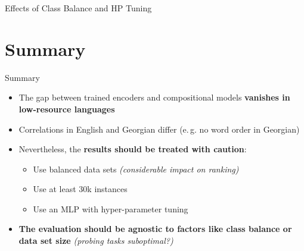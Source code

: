 \documentclass[accentcolor=tud1a,colorbacktitle,inverttitle,landscape,german,presentation,t]{tudbeamer}
\begin{document}
\begin{frame}{Effects of Class Balance and HP Tuning}{}
	\vspace*{-8mm}
	
\end{frame}

\section{Summary}

\begin{frame}{Summary}{}
	\vspace*{-4mm}
	\begin{itemize}\setlength\itemsep{1em}
		\item The gap between trained encoders and compositional models \textbf{vanishes in low-resource languages}
		\item Correlations in English and Georgian differ (e.\,g. no word order in Georgian)
		\item Nevertheless, the \textbf{results should be treated with caution}:
		\begin{itemize}\setlength\itemsep{1em}
			\item Use balanced data sets \textit{(considerable impact on ranking)}
			\item Use at least 30k instances
			\item Use an MLP with hyper-parameter tuning
		\end{itemize}
		\item \textbf{The evaluation should be agnostic to factors like class balance or data set size} \textit{(probing tasks suboptimal?)}
	\end{itemize}
\end{frame}
\end{document}
